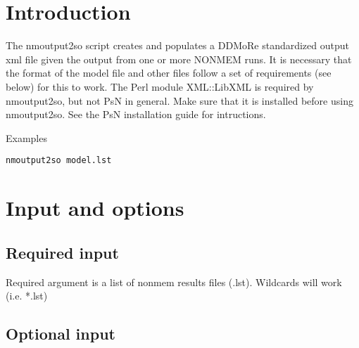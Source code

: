 



\maketitle

\section{Introduction}
The nmoutput2so script creates and populates a DDMoRe standardized output xml file given the output from one or more NONMEM runs. It is necessary that the format of the model file and other files follow a set of requirements (see below) for this to work. The Perl module XML::LibXML is required by nmoutput2so, but not PsN in general. Make sure that it is installed before using nmoutput2so. See the PsN installation guide for intructions.


Examples
\begin{verbatim}
nmoutput2so model.lst
\end{verbatim}

\section{Input and options}

\subsection{Required input}
Required argument is a list of nonmem results files (.lst). Wildcards will work (i.e. *.lst)


\subsection{Optional input}

